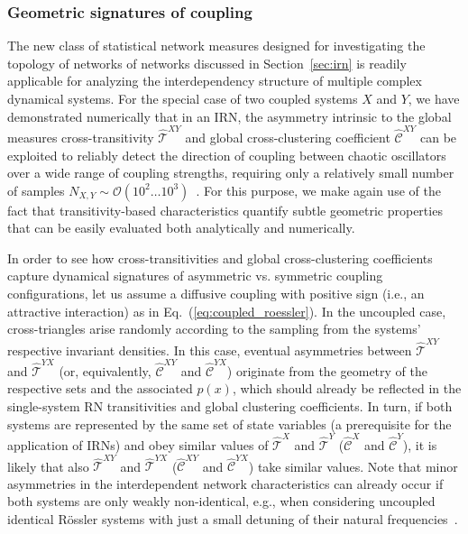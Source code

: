 		\subsubsection{Geometric signatures of coupling}
		The new class of statistical network measures designed for investigating the topology of networks of networks discussed in Section~\ref{sec:irn} is readily applicable for analyzing the interdependency structure of multiple complex dynamical systems. For the special case of two coupled systems $X$ and $Y$, we have demonstrated numerically that in an IRN, the asymmetry intrinsic to the global measures cross-transitivity $\hat{\mathcal{T}}^{XY}$ and global cross-clustering coefficient $\hat{\mathcal{C}}^{XY}$ can be exploited to reliably detect the direction of coupling between chaotic oscillators over a wide range of coupling strengths, requiring only a relatively small number of samples $N_{X,Y}\sim\mathcal{O}(10^2\dots 10^3)$~\cite{Feldhoff2012}. For this purpose, we make again use of the fact that transitivity-based characteristics quantify subtle geometric properties that can be easily evaluated both analytically and numerically. 

		In order to see how cross-transitivities and global cross-clustering coefficients capture dynamical signatures of asymmetric vs. symmetric coupling configurations, let us assume a diffusive coupling with positive sign (i.e., an attractive interaction) as in Eq.~(\ref{eq:coupled_roessler}). In the uncoupled case, cross-triangles arise randomly according to the sampling from the systems' respective invariant densities. In this case, eventual asymmetries between $\hat{\mathcal{T}}^{XY}$ and $\hat{\mathcal{T}}^{YX}$ (or, equivalently, $\hat{\mathcal{C}}^{XY}$ and $\hat{\mathcal{C}}^{YX}$) originate from the geometry of the respective sets and the associated $p(x)$, which should already be reflected in the single-system RN transitivities and global clustering coefficients. In turn, if both systems are represented by the same set of state variables (a prerequisite for the application of IRNs) and obey similar values of $\hat{\mathcal{T}}^{X}$ and $\hat{\mathcal{T}}^{Y}$ ($\hat{\mathcal{C}}^{X}$ and $\hat{\mathcal{C}}^{Y}$), it is likely that also $\hat{\mathcal{T}}^{XY}$ and $\hat{\mathcal{T}}^{YX}$ ($\hat{\mathcal{C}}^{XY}$ and $\hat{\mathcal{C}}^{YX}$) take similar values. Note that minor asymmetries in the interdependent network characteristics can already occur if both systems are only weakly non-identical, e.g., when considering uncoupled identical R\"ossler systems with just a small detuning of their natural frequencies~\cite{Feldhoff2012}.

